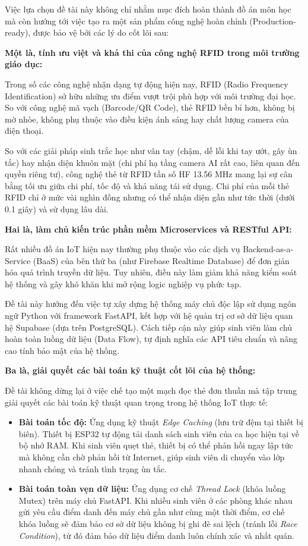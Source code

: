\documentclass[12pt,a4paper]{report}
\begin{document}
Việc lựa chọn đề tài này không chỉ nhằm mục đích hoàn thành đồ án môn học mà còn hướng tới việc tạo ra một sản phẩm công nghệ hoàn chỉnh (Production-ready), được bảo vệ bởi các lý do cốt lõi sau:

\textbf{Một là, tính ưu việt và khả thi của công nghệ RFID trong môi trường giáo dục:}

Trong số các công nghệ nhận dạng tự động hiện nay, RFID (Radio Frequency Identification) sở hữu những ưu điểm vượt trội phù hợp với môi trường đại học. So với công nghệ mã vạch (Barcode/QR Code), thẻ RFID bền bỉ hơn, không bị mờ nhòe, không phụ thuộc vào điều kiện ánh sáng hay chất lượng camera của điện thoại. 

So với các giải pháp sinh trắc học như vân tay (chậm, dễ lỗi khi tay ướt, gây ùn tắc) hay nhận diện khuôn mặt (chi phí hạ tầng camera AI rất cao, liên quan đến quyền riêng tư), công nghệ thẻ từ RFID tần số HF 13.56 MHz mang lại sự cân bằng tối ưu giữa chi phí, tốc độ và khả năng tái sử dụng. Chi phí của mỗi thẻ RFID chỉ ở mức vài nghìn đồng nhưng có thể nhận diện gần như tức thời (dưới 0.1 giây) và sử dụng lâu dài.

\textbf{Hai là, làm chủ kiến trúc phần mềm Microservices và RESTful API:}

Rất nhiều đồ án IoT hiện nay thường phụ thuộc vào các dịch vụ Backend-as-a-Service (BaaS) của bên thứ ba (như Firebase Realtime Database) để đơn giản hóa quá trình truyền dữ liệu. Tuy nhiên, điều này làm giảm khả năng kiểm soát hệ thống và gây khó khăn khi mở rộng logic nghiệp vụ phức tạp.

Đề tài này hướng đến việc tự xây dựng hệ thống máy chủ độc lập sử dụng ngôn ngữ Python với framework FastAPI, kết hợp với hệ quản trị cơ sở dữ liệu quan hệ Supabase (dựa trên PostgreSQL). Cách tiếp cận này giúp sinh viên làm chủ hoàn toàn luồng dữ liệu (Data Flow), tự định nghĩa các API tiêu chuẩn và nâng cao tính bảo mật của hệ thống.

\textbf{Ba là, giải quyết các bài toán kỹ thuật cốt lõi của hệ thống:}

Đề tài không dừng lại ở việc chế tạo một mạch đọc thẻ đơn thuần mà tập trung giải quyết các bài toán kỹ thuật quan trọng trong hệ thống IoT thực tế:

\begin{itemize}
\item \textbf{Bài toán tốc độ:} Ứng dụng kỹ thuật \textit{Edge Caching} (lưu trữ đệm tại thiết bị biên). Thiết bị ESP32 tự động tải danh sách sinh viên của ca học hiện tại về bộ nhớ RAM. Khi sinh viên quẹt thẻ, thiết bị có thể phản hồi ngay lập tức mà không cần chờ phản hồi từ Internet, giúp sinh viên di chuyển vào lớp nhanh chóng và tránh tình trạng ùn tắc.

\item \textbf{Bài toán toàn vẹn dữ liệu:} Ứng dụng cơ chế \textit{Thread Lock} (khóa luồng Mutex) trên máy chủ FastAPI. Khi nhiều sinh viên ở các phòng khác nhau gửi yêu cầu điểm danh đến máy chủ gần như cùng một thời điểm, cơ chế khóa luồng sẽ đảm bảo cơ sở dữ liệu không bị ghi đè sai lệch (tránh lỗi \textit{Race Condition}), từ đó đảm bảo dữ liệu điểm danh luôn chính xác và nhất quán.
\end{itemize}
\end{document}
